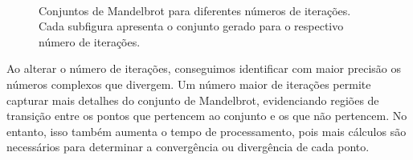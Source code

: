 \begin{enumerate}
\begin{figure}[H]
{    }
    \\
    \caption{Conjuntos de Mandelbrot para diferentes números de iterações. Cada subfigura apresenta o conjunto gerado para o respectivo número de iterações.}
\end{figure} 

    Ao alterar o número de iterações, conseguimos identificar com maior precisão os números complexos que divergem. Um número maior de iterações permite capturar mais detalhes do conjunto de Mandelbrot, evidenciando regiões de transição entre os pontos que pertencem ao conjunto e os que não pertencem. No entanto, isso também aumenta o tempo de processamento, pois mais cálculos são necessários para determinar a convergência ou divergência de cada ponto.


\end{enumerate}
